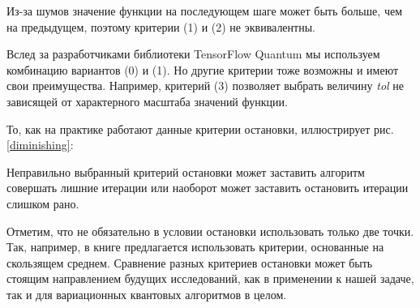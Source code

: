 Из-за шумов значение функции на последующем шаге может быть больше, чем на предыдущем, поэтому критерии (1) и (2) не эквивалентны.

Вслед за разработчиками библиотеки TensorFlow Quantum \cite{tfq} мы используем комбинацию вариантов (0) и (1). Но другие критерии тоже возможны и имеют свои преимущества. Например, критерий (3) позволяет выбрать величину \textsl{tol} не зависящей от характерного масштаба значений функции. 

То, как на практике работают данные критерии остановки, иллюстрирует рис. \ref{diminishing}:



Неправильно выбранный критерий остановки может заставить алгоритм совершать лишние итерации или наоборот может заставить остановить итерации слишком рано.

Отметим, что не обязательно в условии остановки использовать только две точки. Так, например, в книге \cite{cross-entropy} предлагается использовать критерии, основанные на скользящем среднем. Сравнение разных критериев остановки может быть стоящим направлением будущих исследований, как в применении к нашей задаче, так и для вариационных квантовых алгоритмов в целом.



